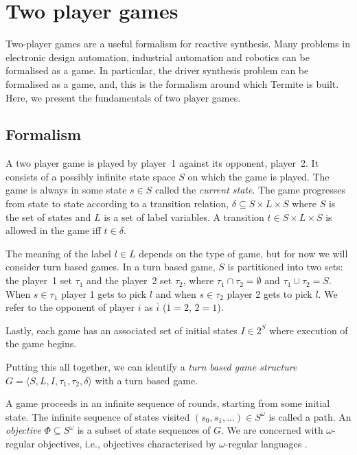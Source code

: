\section{Two player games}

Two-player games are a useful formalism for reactive synthesis. Many problems in electronic design automation, industrial automation and robotics can be formalised as a game. In particular, the driver synthesis problem can be formalised as a game, and, this is the formalism around which Termite is built. Here, we present the fundamentals of two player games. 

\subsection{Formalism}

A two player game is played by player~1 against its opponent, player~2. It consists of a possibly infinite state space $S$ on which the game is played. The game is always in some state $s \in S$ called the \emph{current state}. The game progresses from state to state according to a transition relation, $\delta \subseteq S \times L \times S$ where $S$ is the set of states and $L$ is a set of label variables. A transition $t \in S \times L \times S$ is allowed in the game iff $t \in \delta$. 

The meaning of the label $l \in L$ depends on the type of game, but for now we will consider turn based games. In a turn based game, $S$ is partitioned into two sets: the player~1 set $\tau_1$ and the player~2 set $\tau_2$, where $\tau_1 \cap \tau_2 = \emptyset$ and $ \tau_1 \cup \tau_2 = S$. When $s \in \tau_1$ player 1 gets to pick $l$ and when $s \in \tau_2$ player 2 gets to pick $l$. We refer to the opponent of player $i$ as $\overline{i}$ ($\overline{1} = 2$, $\overline{2} = 1$).

Lastly, each game has an associated set of initial states $I \in 2^S$ where execution of the game begins.

Putting this all together, we can identify a \emph{turn based game structure} $G = \langle S,L,I,\tau_1,\tau_2,\delta \rangle$ with a turn based game.

A game proceeds in an infinite sequence of rounds, starting from some initial state. The infinite sequence of states visited $(s_0, s_1,\ldots) \in S^\omega$ is called a path. An \emph{objective} $\Phi \subseteq S^\omega$ is a subset of state sequences of $G$. We are concerned with $\omega$-regular objectives, i.e., objectives characterised by $\omega$-regular languages \cite{omega_reg_lang}. 

